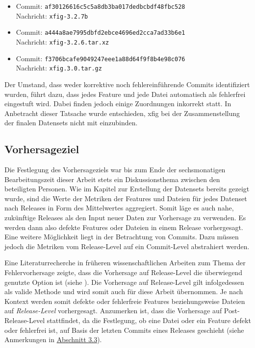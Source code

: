 \begin{itemize}
\setlength{\itemsep}{-2pt}
\item Commit: \texttt{af30126616c5c5a8db3ba017dedbcbdf48fbc528}\\Nachricht: \texttt{xfig-3.2.7b}
\item Commit: \texttt{a444a8ae7995dbfd2ebce4696ed2cca7ad33b6e1}\\Nachricht: \texttt{xfig-3.2.6.tar.xz}
\item Commit: \texttt{f3706bcafe9049247eee1a88d64f9f8b4e98c076}\\Nachricht: \texttt{xfig.3.0.tar.gz}
\end{itemize}

Der Umstand, dass weder korrektive noch fehlereinführende Commits identifiziert wurden, führt dazu, dass jedes Feature und jede Datei automatisch als \glqq fehlerfrei\grqq{} eingestuft wird. Dabei finden jedoch einige Zuordnungen inkorrekt statt. In Anbetracht dieser Tatsache wurde entschieden, \glqq xfig\grqq{} bei der Zusammenstellung der finalen Datensets nicht mit einzubinden.

\subsection*{Vorhersageziel}
Die Festlegung des Vorhersageziels war bis zum Ende der sechsmonatigen Bearbeitungszeit dieser Arbeit stets ein Diskussionsthema zwischen den beteiligten Personen. Wie im Kapitel zur Erstellung der Datensets bereits gezeigt wurde, sind die Werte der Metriken der Features und Dateien für jedes Datenset nach Releases in Form des Mittelwertes aggregiert. Somit läge es auch nahe, zukünftige Releases als den Input neuer Daten zur Vorhersage zu verwenden. Es werden dann also defekte Features oder Dateien in einem Release vorhergesagt. Eine weitere Möglichkeit liegt in der Betrachtung von Commits. Dazu müssen jedoch die Metriken vom Release-Level auf ein Commit-Level abstrahiert werden.

Eine Literaturrecherche in früheren wissenschaftlichen Arbeiten zum Thema der Fehlervorhersage zeigte, dass die Vorhersage auf Release-Level die überwiegend genutzte Option ist (siehe \cite{Queiroz2016,Zimmermann2007,Moser2008,Dhiauddin2012,Wang2012,Li2017}). Die Vorhersage auf Release-Level gilt infolgedessen als valide Methode und wird somit auch für diese Arbeit übernommen. Je nach Kontext werden somit defekte oder fehlerfreie Features beziehungsweise Dateien auf \emph{Release-Level} vorhergesagt. Anzumerken ist, dass die Vorhersage auf Post-Release-Level stattfindet, da die Festlegung, ob eine Datei oder ein Feature defekt oder fehlerfrei ist, auf Basis der letzten Commits eines Releases geschieht (siehe Anmerkungen in \hyperref[label-explanation]{Abschnitt 3.3}).

